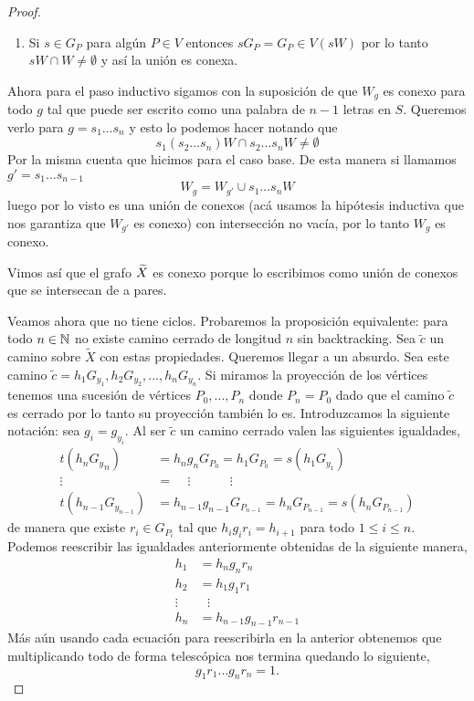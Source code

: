 \documentclass[tesis.tex]{subfiles}
\begin{document}
\begin{proof}
\begin{enumerate}
		\item Si $s \in G_P$ para algún $P \in V$ entonces $s G_P = G_P \in V(sW)$ por lo tanto $sW \cap W \neq \emptyset$ y así la unión es conexa.
	\end{enumerate} 

	Ahora para el paso inductivo sigamos con la suposición de que $W_{g}$ es conexo para todo $g$ tal que puede ser escrito como una palabra de $n-1$ letras en $S$. 
	Queremos verlo para $g = s_1\dots s_n$ y esto lo podemos hacer notando que 
	\[
	s_1(s_2 \dots s_n) W \cap s_2 \dots s_{n} W \neq \emptyset 
	\]
	Por la misma cuenta que hicimos para el caso base.
	De esta manera si llamamos $g' = s_{1} \dots s_{n-1}$
	\[
		W_{g} = W_{g'} \cup s_{1}\dots s_{n}W
	\]
	luego por lo visto es una unión de conexos (acá usamos la hipótesis inductiva que nos garantiza que $W_{g'}$ es conexo) con intersección no vacía, por lo tanto $W_{g}$ es conexo.
	
	Vimos así que el grafo $\widetilde X$ es conexo porque lo escribimos como unión de conexos que se intersecan de a pares.
	
	Veamos ahora que no tiene ciclos.
	Probaremos la proposición equivalente: para todo $n \in \mathbb{N}$ no existe camino cerrado de longitud $n$ sin backtracking.
	Sea $\tilde c$ un camino sobre $\tilde X$ con estas propiedades. 
	Queremos llegar a un absurdo.
	Sea este camino $\tilde c = h_1G_{y_1}, h_2 G_{y_2}, \dots, h_n G_{y_n}$.
	Si miramos la proyección de los vértices tenemos una sucesión de vértices $P_0, \dots, P_n$ donde $P_n = P_0$ dado que el camino $\tilde c$ es cerrado por lo tanto su proyección también lo es.
	Introduzcamos la siguiente notación: sea $g_i = g_{y_i}$.
	Al ser $\tilde c$ un camino cerrado valen las siguientes igualdades,
	\begin{align*}
		t(h_n{G_y}_n) &= h_ng_nG_{P_0} = h_1G_{P_0} = s(h_1G_{ y_1}) \\ 
		\vdots \ \ \  &= \ \ \ \ \    \vdots\ \ \ \ \ \ \ \ \ \ \ \ \ \    \vdots \\
		t(h_{n-1}G_{y_{n-1}}) &= h_{n-1}g_{n-1}G_{P_{n-1}} = h_{n}G_{P_{n-1}} = s(h_nG_{P_{n-1}} )  
	\end{align*}
	de manera que existe $r_i \in G_{P_i}$ tal que $h_ig_ir_i = h_{i+1}$ para todo $1 \le i \le n$. 	
	Podemos reescribir las igualdades anteriormente obtenidas de la siguiente manera,
	\begin{align*}
		h_1 &= h_{n}g_{n}r_{n} \\
		h_2 &= h_1g_1r_1 \\
		\vdots & \ \ \ \vdots \\
		h_n &= h_{n-1}g_{n-1}r_{n-1} 
	\end{align*}
	Más aún usando cada ecuación para reescribirla en la anterior obtenemos que multiplicando todo de forma telescópica nos termina quedando lo siguiente,
	\begin{equation*}
		g_1r_1\dots g_nr_n = 1.
	\end{equation*} 
	

\end{proof}
\end{document}
